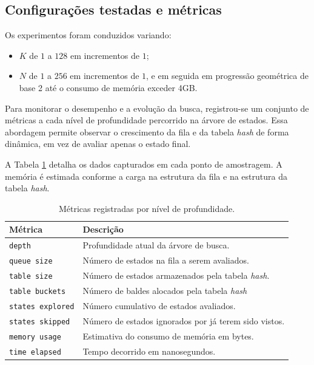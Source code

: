 \documentclass[12pt]{article}
\begin{document}
\subsection{Configurações testadas e métricas}

Os experimentos foram conduzidos variando:

\begin{itemize}
    \item $K$ de $1$ a $128$ em incrementos de $1$;
    \item $N$ de $1$ a $256$ em incrementos de $1$, e em seguida em progressão geométrica de base 2 até o consumo de memória exceder 4GB.
\end{itemize}

Para monitorar o desempenho e a evolução da busca, registrou-se um conjunto de métricas a cada nível de profundidade percorrido na árvore de estados. Essa abordagem permite observar o crescimento da fila e da tabela \textit{hash} de forma dinâmica, em vez de avaliar apenas o estado final.

A Tabela \ref{table:metricas} detalha os dados capturados em cada ponto de amostragem. A memória é estimada conforme a carga na estrutura da fila e na estrutura da tabela \textit{hash}.

\begin{table}[H]
\centering
\caption{Métricas registradas por nível de profundidade.}
\label{table:metricas}
\small
\begin{tabular}{p{3.5cm} p{11.5cm}}
\toprule
\textbf{Métrica} & \textbf{Descrição} \\
\midrule
\texttt{depth} & Profundidade atual da árvore de busca. \\
\texttt{queue size} & Número de estados na fila a serem avaliados. \\
\texttt{table size} & Número de estados armazenados pela tabela \textit{hash}. \\
\texttt{table buckets} & Número de baldes alocados pela tabela \textit{hash} \\
\texttt{states explored} & Número cumulativo de estados avaliados. \\
\texttt{states skipped} & Número de estados ignorados por já terem sido vistos. \\
\texttt{memory usage} & Estimativa do consumo de memória em bytes. \\
\texttt{time elapsed} & Tempo decorrido em nanosegundos. \\
\bottomrule
\end{tabular}
\end{table}
\end{document}
